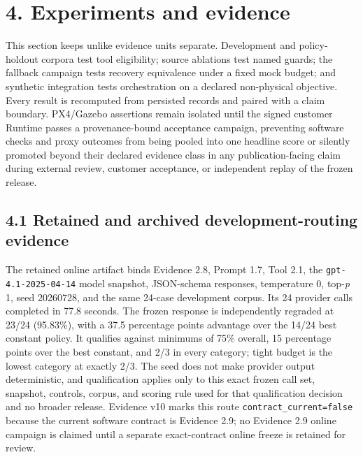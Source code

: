 \section{\texorpdfstring{\textbf{4. Experiments and
evidence}}{4. Experiments and evidence}}\label{experiments-and-evidence}

This section keeps unlike evidence units separate. Development and
policy-holdout corpora test tool eligibility; source ablations test
named guards; the fallback campaign tests recovery equivalence under a
fixed mock budget; and synthetic integration tests orchestration on a
declared non-physical objective. Every result is recomputed from
persisted records and paired with a claim boundary. PX4/Gazebo
assertions remain isolated until the signed customer Runtime passes a
provenance-bound acceptance campaign, preventing software
checks and proxy outcomes from being pooled into one headline score or
silently promoted beyond their declared evidence class in any
publication-facing claim during external review, customer acceptance, or
independent replay of the frozen release.

\subsection{\texorpdfstring{\textbf{4.1 Retained and archived
development-routing evidence}}{4.1 Retained and archived development-routing evidence}}\label{development-routing-evidence}

The retained online artifact binds Evidence 2.8, Prompt 1.7, Tool 2.1,
the \texttt{gpt-4.1-2025-04-14} model snapshot, JSON-schema responses,
temperature 0, top-\emph{p} 1, seed 20260728, and the same 24-case
development corpus. Its 24 provider calls completed in 77.8 seconds.
The frozen response is independently regraded at 23/24 (95.83\%), with
a 37.5 percentage points advantage over the 14/24 best constant policy.
It qualifies against minimums of 75\% overall, 15 percentage points over
the best constant, and 2/3 in every category; tight budget is the lowest
category at exactly 2/3. The seed does not make provider output
deterministic, and qualification applies only to this exact frozen call
set, snapshot, controls, corpus, and scoring rule used for that
qualification decision and no broader release. Evidence v10 marks this
route \texttt{contract\_current=false} because the current software
contract is Evidence 2.9; no Evidence 2.9 online campaign is claimed until
a separate exact-contract online freeze is retained for review.

